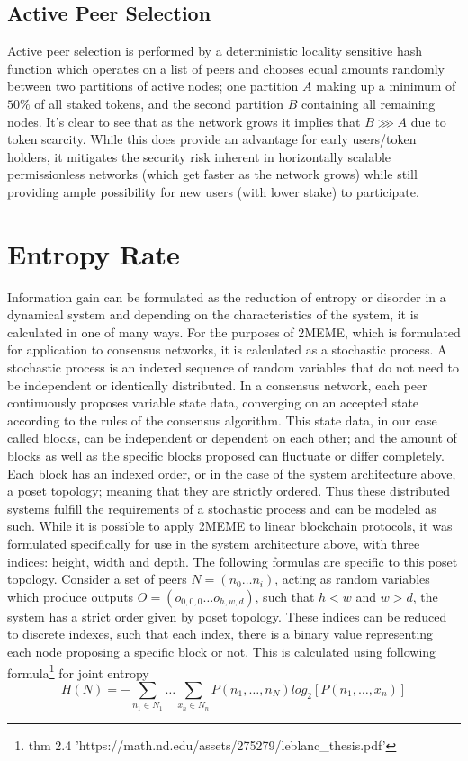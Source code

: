 \documentclass{article}
\begin{document}
\subsection{Active Peer Selection}
Active peer selection is performed by a deterministic locality sensitive hash function which operates on a list of peers and chooses equal amounts randomly between two partitions of active nodes; one partition $A$ making up a minimum of $50\%$ of all staked tokens, and the second partition $B$ containing all remaining nodes. It's clear to see that as the network grows it implies that $B \ggg A$ due to token scarcity. While this does provide an advantage for early users/token holders, it mitigates the security risk inherent in horizontally scalable permissionless networks (which get faster as the network grows) while still providing ample possibility for new users (with lower stake) to participate. 


\section{Entropy Rate}
Information gain can be formulated as the reduction of entropy or disorder in a dynamical system and depending on the characteristics of the system, it is calculated in one of many ways. For the purposes of 2MEME, which is formulated for application to consensus networks, it is calculated as a stochastic process.
	A stochastic process is an indexed sequence of random variables that do not need to be independent or identically distributed. In a consensus network, each peer continuously proposes variable state data, converging on an accepted state according to the rules of the consensus algorithm. This state data, in our case called blocks, can be independent or dependent on each other; and the amount of blocks as well as the specific blocks proposed can fluctuate or differ completely. Each block has an indexed order, or in the case of the system architecture above, a poset topology; meaning that they are strictly ordered. Thus these distributed systems fulfill the requirements of a stochastic process and can be modeled as such. While it is possible to apply 2MEME to linear blockchain protocols, it was formulated specifically for use in the system architecture above, with three indices: height, width and depth. The following formulas are specific to this poset topology.
	Consider a set of peers $N = (n_0 …n_i)$, acting as random variables which produce outputs $O = (o_{0,0,0} … o_{h,w,d})$, such that $h<w$ and $w>d$, the system has a strict order given by poset topology. These indices can be reduced to discrete indexes, such that each index, there is a binary value representing each node proposing a specific block or not. This is calculated using following formula\footnote{thm 2.4 'https://math.nd.edu/assets/275279/leblanc\_thesis.pdf'} for joint entropy	
\begin{equation}
H(N) = -\sum_{n_1 \in N_1} \dots \sum_{x_n \in N_n} P(n_1,  \dots, n_N) log_2 [P(n_1, \dots, x_n)]
\end{equation}
	
\end{document}
